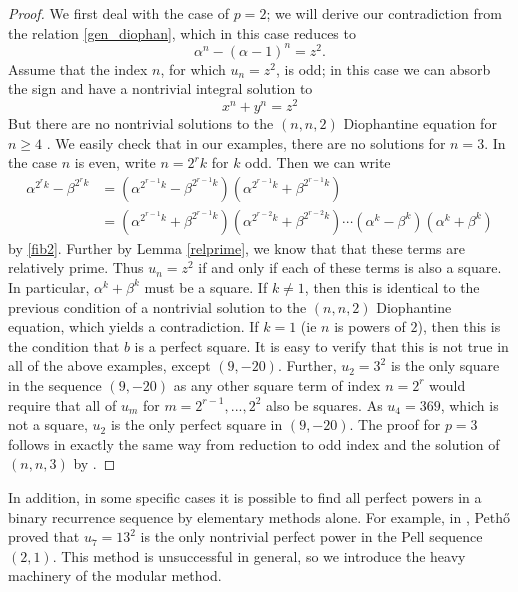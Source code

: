 \documentclass[12pt]{amsart}
\theoremstyle{definition}
\begin{document}
\begin{proof}

We first deal with the case of $p=2$; we will derive our contradiction from the relation \eqref{gen_diophan}, which in this case reduces to
\begin{equation}\label{D1dio} \alpha^n - (\alpha-1)^n = z^2.\end{equation} 
Assume that the index $n$, for which $u_n = z^2$, is odd; in this case we can absorb the sign and have a nontrivial integral solution to
\[ x^n +y^n = z^2 \]
But there are no nontrivial solutions to the $(n,n,2)$ Diophantine equation for $n \geq 4$  \cite{darmon97} .  We easily check that in our examples, there are no solutions for $n=3$.  In the case $n$ is even, write $n=2^rk$ for $k$ odd.  Then we can write
\begin{align*}
\alpha^{2^rk} - \beta^{2^rk} & = (\alpha^{2^{r-1}k} - \beta^{2^{r-1}k})(\alpha^{2^{r-1}k} + \beta^{2^{r-1}k}) \\
& = (\alpha^{2^{r-1}k} + \beta^{2^{r-1}k})(\alpha^{2^{r-2}k} + \beta^{2^{r-2}k}) \cdots (\alpha^{k} - \beta^{k}) (\alpha^{k} + \beta^{k})
\end{align*}
by \eqref{fib2}.  Further by Lemma \ref{relprime}, we know that that these terms are relatively prime.  Thus $u_n=z^2$ if and only if each of these terms is also a square.  In particular, $\alpha^k + \beta^k$ must be a square.  If $k \neq 1$, then this is identical to the previous condition of a nontrivial solution to the $(n,n,2)$ Diophantine equation, which yields a contradiction.  If $k = 1$ (ie $n$ is powers of $2$), then this is the condition that $b$ is a perfect square.  It is easy to verify that this is not true in all of the above examples, except $(9,-20)$.  Further, $u_2 = 3^2$ is the only square in the sequence $(9,-20)$ as any other square term of index $n = 2^r$ would require that all of $u_m$ for $m = 2^{r-1},...,2^2$ also be squares.  As $u_4 = 369$, which is not a square, $u_2$ is the only perfect square in $(9,-20)$.  The proof for $p=3$ follows in exactly the same way from reduction to odd index and the solution of $(n,n,3)$ by \cite{darmon97}.

\end{proof}

In addition, in some specific cases it is possible to find all perfect powers in a binary recurrence sequence by elementary methods alone.  For example, in \cite{petho92}, Peth{\H{o}} proved that $u_7 = 13^2$ is the only nontrivial perfect power in the Pell sequence $(2,1)$.  This method is unsuccessful in general, so we introduce the heavy machinery of the modular method.
\end{document}
